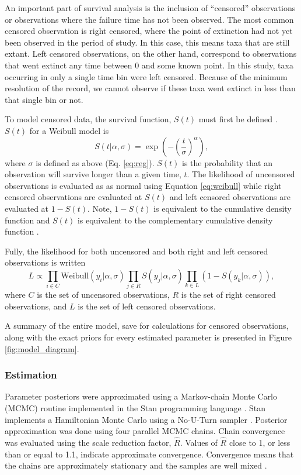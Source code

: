 \documentclass[12pt,letterpaper]{article}
\begin{document}
An important part of survival analysis is the inclusion of ``censored'' observations \citep{Ibrahim2001,Klein2003} or observations where the failure time has not been observed. The most common censored observation is right censored, where the point of extinction had not yet been observed in the period of study. In this case, this means taxa that are still extant. Left censored observations, on the other hand, correspond to observations that went extinct any time between 0 and some known point. In this study, taxa occurring in only a single time bin were left censored. Because of the minimum resolution of the record, we cannot observe if these taxa went extinct in less than that single bin or not. 

To model censored data, the survival function, \(S(t)\) must first be defined \citep{Klein2003}. \(S(t)\) for a Weibull model is
\begin{equation}
  S(t | \alpha, \sigma) = \exp\left(-\left(\frac{t}{\sigma}\right)^{\alpha}\right),
  \label{eq:surv}
\end{equation}
where \(\sigma\) is defined as above (Eq. \ref{eq:reg}). \(S(t)\) is the probability that an observation will survive longer than a given time, \(t\). The likelihood of uncensored observations is evaluated as as normal using Equation \ref{eq:weibull} while right censored observations are evaluated at \(S(t)\) and left censored observations are evaluated at \(1 - S(t)\). Note, \(1 - S(t)\) is equivalent to the cumulative density function and \(S(t)\) is equivalent to the complementary cumulative density function \citep{Gelman2013d}.

Fully, the likelihood for both uncensored and both right and left censored observations is written
\begin{equation*}
  L \propto \prod_{i \in C} \mathrm{Weibull}(y_{i} | \alpha, \sigma) \prod_{j \in R} S(y_j | \alpha, \sigma) \prod_{k \in L} \left(1 - S(y_{k} | \alpha, \sigma)\right),
\end{equation*}
where \(C\) is the set of uncensored observations, \(R\) is the set of right censored observations, and \(L\) is the set of left censored observations.

A summary of the entire model, save for calculations for censored observations, along with the exact priors for every estimated parameter is presented in Figure \ref{fig:model_diagram}.


\subsubsection{Estimation}
Parameter posteriors were approximated using a Markov-chain Monte Carlo (MCMC) routine implemented in the Stan programming language \citep{2014stan}. Stan implements a Hamiltonian Monte Carlo using a No-U-Turn sampler \citep{Hoffman-Gelman:2011}. Posterior approximation was done using four parallel MCMC chains. Chain convergence was evaluated using the scale reduction factor, \(\hat{R}\). Values of \(\hat{R}\) close to 1, or less than or equal to 1.1, indicate approximate convergence. Convergence means that the chains are approximately stationary and the samples are well mixed \citep{Gelman2013d}.
\end{document}
